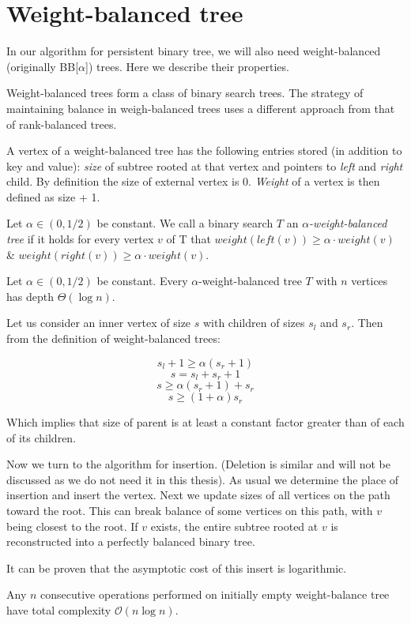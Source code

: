 \section{Weight-balanced tree}

In our algorithm for persistent binary tree, we will also need weight-balanced (originally BB[$\alpha$]) trees. Here we describe their properties.

Weight-balanced trees form a class of binary search trees. The strategy of maintaining balance in weigh-balanced trees uses a different approach from that of rank-balanced trees.

A vertex of a weight-balanced tree has the following entries stored (in addition to key and value): {\em size} of subtree rooted at that vertex and pointers to {\em left} and {\em right} child. By definition the size of external vertex is 0. {\em Weight} of a vertex is then defined as size + 1.

\begin{defn}
Let $\alpha \in (0,1/2)$ be constant. We call a binary search $T$ an {\em $\alpha$-weight-balanced tree} if it holds for every vertex $v$ of T that $weight(left(v)) \geq \alpha \cdot weight(v)$ \& $weight(right(v)) \geq \alpha \cdot weight(v) $.
\end{defn}

\begin{prop}
Let $\alpha \in (0,1/2)$ be constant. Every $\alpha$-weight-balanced tree $T$ with $n$ vertices has depth $\Theta(\log n)$. 
\end{prop}

\begin{myproof}
Let us consider an inner vertex of size $s$ with children of sizes $s_l$ and $s_r$. Then from the definition of weight-balanced trees:

$$s_l + 1 \geq \alpha (s_r+1)$$
$$ s = s_l + s_r + 1 $$
$$ s \geq \alpha (s_r+1) + s_r $$
$$ s \geq (1+\alpha)s_r $$

Which implies that size of parent is at least a constant factor greater than of each of its children.
\end{myproof}

Now we turn to the algorithm for insertion. (Deletion is similar and will not be discussed as we do not need it in this thesis). As usual we determine the place of insertion and insert the vertex. Next we update sizes of all vertices on the path toward the root. This can break balance of some vertices on this path, with $v$ being closest to the root. If $v$ exists, the entire subtree rooted at $v$ is reconstructed into a perfectly balanced binary tree.

It can be proven that the asymptotic cost of this insert is logarithmic.

\begin{prop}
Any $n$ consecutive operations performed on initially empty weight-balance tree have total complexity $\mathcal{O}(n \log n)$. 
\end{prop}

